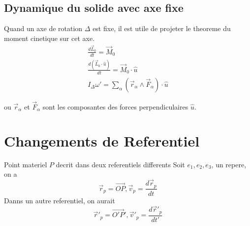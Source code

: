 \documentclass[../main.tex]{subfiles}
\begin{document}
\subsection{Dynamique du solide avec axe fixe}
Quand un axe de rotation $\Delta$ est fixe, il est utile de projeter le theoreme du moment cinetique sur cet axe.
\begin{align*}
	\frac{d \vec{L}_0}{dt} = \vec{M}_0\\
	\frac{d ( \vec{L}_0 \cdot \hat{u} )}{dt} = \vec{M}_0 \cdot \hat{u}\\
	I_{\Delta} \omega' = \sum_\alpha( \vec{r}_\alpha \land \vec{F}_\alpha) \cdot \hat{u}	
\end{align*}

ou $\vec{r}_\alpha$ et $\vec{F}_\alpha$ sont les composantes des forces perpendiculaires $\hat{u}$.
\section{Changements de Referentiel}
Point materiel $P$ decrit dans deux referentiels differents
Soit $e_1, e_2, e_3$, un repere, on a
\[ 
\vec{r}_p = \vec{OP}, \vec{v}_p = \frac{d \vec{r}_p}{dt}
\]
Danns un autre referentiel, on aurait
\[ 
\vec{r}'_p = \vec{O'P}', \vec{v}'_p = \frac{d \vec{r}'_p}{dt'}
\]
\end{document}
